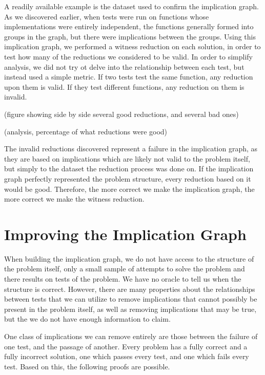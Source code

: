\documentclass[11pt]{article}
\begin{document}
A readily available example is the dataset used to confirm the implication graph. As we discovered earlier, when tests were run on functions whose implementations were entirely independent, the functions generally formed into groups in the  graph, but there were implications between the groups. Using this implication graph, we performed a witness reduction on each solution, in order to test how many of the reductions we considered to be valid. In order to simplify analysis, we did not try ot delve into the relationship between each test, but instead used a simple metric. If two tests test the same function, any reduction upon them is valid. If they test different  functions, any reduction on them is invalid.

(figure showing side by side several good reductions, and several bad ones)

(analysis, percentage of what reductions were good)

The invalid reductions discovered represent a failure in the implication graph, as they are based on implications which are likely not valid to the problem itself, but simply to the dataset the reduction process was done on. If the implication graph perfectly represented the problem structure, every reduction based on it would be good. Therefore, the more correct we make the implication graph, the more correct we make the witness reduction.



\section{Improving the Implication Graph}



When building the implication graph, we do not have access to the structure of the problem itself, only a small sample of attempts to solve the problem and there results on tests of the problem. We have no oracle to tell us when the structure is correct. However, there are many properties about the relationships between tests that we can utilize to remove implications that cannot possibly be present in the problem itself, as well as removing implications that may be true, but the we do not have enough information  to claim.

One class of implications we can remove entirely are those between the failure of one test, and the passage of another. Every problem has a fully correct and a fully incorrect solution, one which passes every test, and one which fails every test. Based on this, the following proofs are possible.
\end{document}
